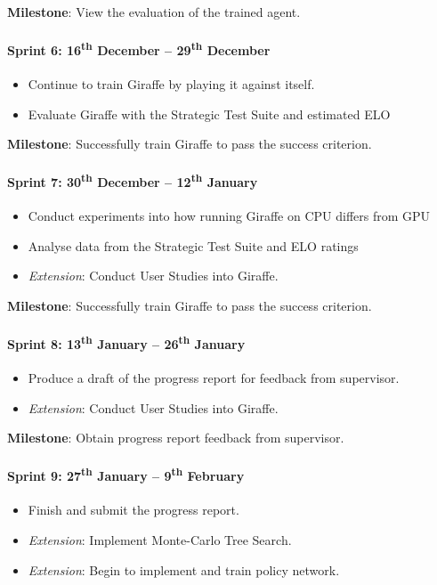 \documentclass[a4paper]{article}
\begin{document}
\textbf{Milestone}: View the evaluation of the trained agent.

\paragraph{Sprint 6: 16\textsuperscript{th} December -- 29\textsuperscript{th} December}
\begin{itemize}
\item Continue to train Giraffe by playing it against itself.
\item Evaluate Giraffe with the Strategic Test Suite and estimated ELO
\end{itemize}

\textbf{Milestone}: Successfully train Giraffe to pass the success criterion.

\paragraph{Sprint 7: 30\textsuperscript{th} December -- 12\textsuperscript{th} January}
\begin{itemize}
\item Conduct experiments into how running Giraffe on CPU differs from GPU
\item Analyse data from the Strategic Test Suite and ELO ratings
\item \textit{Extension}: Conduct User Studies into Giraffe.
\end{itemize}

\textbf{Milestone}: Successfully train Giraffe to pass the success criterion.

\paragraph{Sprint 8: 13\textsuperscript{th} January -- 26\textsuperscript{th} January}
\begin{itemize}
\item Produce a draft of the progress report for feedback from supervisor.
\item \textit{Extension}: Conduct User Studies into Giraffe.
\end{itemize}
\textbf{Milestone}: Obtain progress report feedback from supervisor.

\paragraph{Sprint 9: 27\textsuperscript{th} January -- 9\textsuperscript{th} February}
\begin{itemize}
\item Finish and submit the progress report.
\item \textit{Extension}: Implement Monte-Carlo Tree Search.
\item \textit{Extension}: Begin to implement and train policy network.
\end{itemize}
\end{document}
